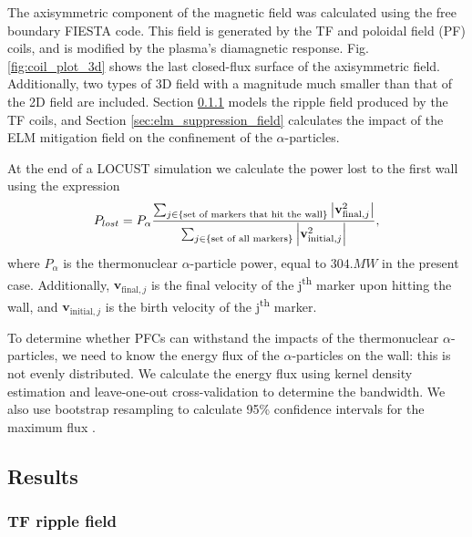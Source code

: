 \documentclass[10pt, a4paper, twoside]{article}
\begin{document}
The axisymmetric component of the magnetic field was calculated using the free boundary FIESTA code. This field is generated by the TF and poloidal field (PF) coils, and is modified by the plasma's diamagnetic response. Fig. \ref{fig:coil_plot_3d} shows the last closed-flux surface of the axisymmetric field. Additionally, two types of 3D field with a magnitude much smaller than that of the 2D field are included. Section \ref{sec:tf_ripple_field} models the ripple field produced by the TF coils, and Section \ref{sec:elm_suppression_field} calculates the impact of the ELM mitigation field on the confinement of the $\alpha$-particles.

At the end of a LOCUST simulation we calculate the power lost to the first wall using the expression 
\begin{equation} 
P_{lost} = P_\alpha \frac{\sum_{j\in \text{\{set of markers that hit the wall\}}}\abs{\textbf{v}_{\text{final}, j}^2}}{\sum_{j \in \{\text{set of all markers}\}} \abs{\mathbf{v}_{\text{initial}, j}^2 }}, 
\end{equation}
where $P_\alpha$ is the thermonuclear $\alpha$-particle power, equal to $\si{304.MW}$ in the present case. Additionally, $\mathbf{v}_{\text{final}, j}$ is the final velocity of the j\textsuperscript{th} marker upon hitting the wall, and $\mathbf{v}_{\text{initial}, j}$ is the birth velocity of the j\textsuperscript{th} marker.

To determine whether PFCs can withstand the impacts of the thermonuclear $\alpha$-particles, we need to know the energy flux of the $\alpha$-particles on the wall: this is not evenly distributed. We calculate the energy flux using kernel density estimation \cite{chen2017} and leave-one-out cross-validation \cite{chen2017} to determine the bandwidth. We also use bootstrap resampling to calculate 95\% confidence intervals for the maximum flux \cite{chen2017}.

\subsection{Results}

\subsubsection{TF ripple field}
\label{sec:tf_ripple_field}
\end{document}

